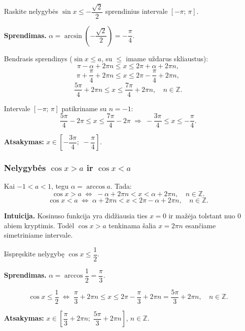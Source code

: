 \begin{example}
Raskite nelygybės $\sin x \leq -\dfrac{\sqrt{2}}{2}$ sprendinius 
intervale $[-\pi;\, \pi]$.

\textbf{Sprendimas.} $\alpha = \arcsin\!\left(-\dfrac{\sqrt{2}}{2}\right) = -\dfrac{\pi}{4}$.

Bendrasis sprendinys ($\sin x \leq a$, su $\leq$ imame uždarus skliaustus):
\[
    \pi - \alpha + 2\pi n \leq x \leq 2\pi + \alpha + 2\pi n,
\]
\[
    \pi + \frac{\pi}{4} + 2\pi n \leq x \leq 2\pi - \frac{\pi}{4} + 2\pi n,
\]
\[
    \frac{5\pi}{4} + 2\pi n \leq x \leq \frac{7\pi}{4} + 2\pi n, \quad n \in \mathbb{Z}.
\]

Intervale $[-\pi;\, \pi]$ patikriname su $n = -1$:
\[
    \frac{5\pi}{4} - 2\pi \leq x \leq \frac{7\pi}{4} - 2\pi 
    \;\Rightarrow\; -\frac{3\pi}{4} \leq x \leq -\frac{\pi}{4}.
\]

\textbf{Atsakymas:} $x \in \left[-\dfrac{3\pi}{4};\; -\dfrac{\pi}{4}\right]$.
\end{example}

\subsubsection*{Nelygybės \(\cos x > a\) ir \(\cos x < a\)}

\begin{tcolorbox}[colback=orange!5, colframe=orange!60!black, 
                  title=Sprendimo formulės]
Kai $-1 < a < 1$, tegu $\alpha = \arccos a$. Tada:
\[
    \cos x > a \;\Leftrightarrow\; -\alpha + 2\pi n < x < \alpha + 2\pi n, 
    \quad n \in \mathbb{Z}.
\]
\[
    \cos x < a \;\Leftrightarrow\; \alpha + 2\pi n < x < 2\pi - \alpha + 2\pi n, 
    \quad n \in \mathbb{Z}.
\]
\end{tcolorbox}

\noindent \textbf{Intuicija.} Kosinuso funkcija yra didžiausia ties $x = 0$ ir mažėja 
tolstant nuo $0$ abiem kryptimis. Todėl $\cos x > a$ tenkinama šalia $x = 2\pi n$ 
esančiame simetriniame intervale.

\begin{example}
Išspręskite nelygybę $\cos x \leq \dfrac{1}{2}$.

\textbf{Sprendimas.} $\alpha = \arccos\dfrac{1}{2} = \dfrac{\pi}{3}$.

\[
    \cos x \leq \frac{1}{2} \;\Leftrightarrow\; \frac{\pi}{3} + 2\pi n \leq x 
    \leq 2\pi - \frac{\pi}{3} + 2\pi n = \frac{5\pi}{3} + 2\pi n, \quad n \in \mathbb{Z}.
\]

\textbf{Atsakymas:} $x \in \left[\dfrac{\pi}{3} + 2\pi n;\; \dfrac{5\pi}{3} + 2\pi n\right]$, 
$n \in \mathbb{Z}$.
\end{example}

